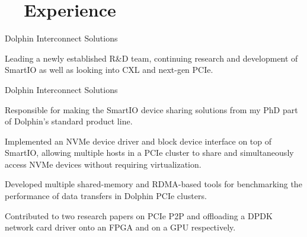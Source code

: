 \section[Experience]{\faBriefcase~~Experience}
\begin{experience}{Dolphin Interconnect Solutions}{%
}
    \item{Leading a newly established R\&D team, continuing research and development of SmartIO as well as looking into CXL and next-gen PCIe.}
\end{experience}

\begin{experience}{Dolphin Interconnect Solutions}{
}
    \item{Responsible for making the SmartIO device sharing solutions from my PhD part of Dolphin's standard product line.}
    \item{Implemented an NVMe device driver and block device interface on top of SmartIO, allowing multiple hosts in a PCIe cluster to share and simultaneously access NVMe devices without requiring virtualization.}
    \item{Developed multiple shared-memory and RDMA-based tools for benchmarking the performance of data transfers in Dolphin PCIe clusters.}
    \item{Contributed to two research papers on PCIe P2P and offloading a DPDK network card driver onto an FPGA and on a GPU respectively.}
\end{experience}

